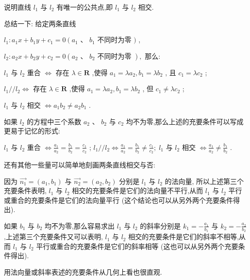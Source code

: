 \documentclass[10pt]{article}
\begin{document}
说明直线 \({l}_{1}\) 与 \({l}_{2}\) 有唯一的公共点,即 \({l}_{1}\) 与 \({l}_{2}\) 相交.

总结一下: 给定两条直线

\({l}_{1} : {a}_{1}x + {b}_{1}y + {c}_{1} = 0\left( {{a}_{1}\text{ 、 }{b}_{1}}\right.\) 不同时为零 \()\) ,

\({l}_{2} : {a}_{2}x + {b}_{2}y + {c}_{2} = 0\left( {{a}_{2}\text{ 、 }{b}_{2}\text{ 不同时为零 }}\right) ,\) 那么:

\({l}_{1}\) 与 \({l}_{2}\) 重合 \(\Leftrightarrow\) 存在 \(\lambda  \in  \mathbf{R}\) ,使得 \({a}_{1} = \lambda {a}_{2},{b}_{1} = \lambda {b}_{2}\) , 且 \({c}_{1} = \lambda {c}_{2}\) ;

\({l}_{1}//{l}_{2} \Leftrightarrow\) 存在 \(\lambda  \in  \mathbf{R}\) ,使得 \({a}_{1} = \lambda {a}_{2},{b}_{1} = \lambda {b}_{2}\) , 但 \({c}_{1} \neq  \lambda {c}_{2}\) ;

\({l}_{1}\) 与 \({l}_{2}\) 相交 \(\Leftrightarrow  {a}_{1}{b}_{2} \neq  {a}_{2}{b}_{1}\) .

如果 \({l}_{2}\) 的方程中三个系数 \({a}_{2}\text{ 、 }{b}_{2}\) 与 \({c}_{2}\) 均不为零,那么上述的充要条件可以写成更易于记忆的形式:

\({l}_{1}\) 与 \({l}_{2}\) 重合 \(\Leftrightarrow  \frac{{a}_{1}}{{a}_{2}} = \frac{{b}_{1}}{{b}_{2}} = \frac{{c}_{1}}{{c}_{2}}\) ; \({l}_{1}//{l}_{2} \Leftrightarrow  \frac{{a}_{1}}{{a}_{2}} = \frac{{b}_{1}}{{b}_{2}} \neq  \frac{{c}_{1}}{{c}_{2}}; \; {l}_{1}\) 与 \({l}_{2}\) 相交 \(\Leftrightarrow  \frac{{a}_{1}}{{a}_{2}} \neq  \frac{{b}_{1}}{{b}_{2}}\) .

还有其他一些量可以简单地刻画两条直线相交与否:

因为 \(\overrightarrow{{n}_{1}} = \left( {{a}_{1},{b}_{1}}\right)\) 与 \(\overrightarrow{{n}_{2}} = \left( {{a}_{2},{b}_{2}}\right)\) 分别是 \({l}_{1}\) 与 \({l}_{2}\) 的法向量, 所以上述第三个充要条件表明, \({l}_{1}\) 与 \({l}_{2}\) 相交的充要条件是它们的法向量不平行,从而 \({l}_{1}\) 与 \({l}_{2}\) 平行或重合的充要条件是它们的法向量平行 (这个结论也可以从另外两个充要条件得出).

如果 \({b}_{1}\) 与 \({b}_{2}\) 均不为零,那么容易求出 \({l}_{1}\) 与 \({l}_{2}\) 的斜率分别是 \({k}_{1} =  - \frac{{a}_{1}}{{b}_{1}}\) 与 \({k}_{2} =  - \frac{{a}_{2}}{{b}_{2}}\) ,上述第三个充要条件又可以表明, \({l}_{1}\) 与 \({l}_{2}\) 相交的充要条件是它们的斜率不相等,从而 \({l}_{1}\) 与 \({l}_{2}\) 平行或重合的充要条件是它们的斜率相等 (这也可以从另外两个充要条件得出).

用法向量或斜率表述的充要条件从几何上看也很直观.
\end{document}
